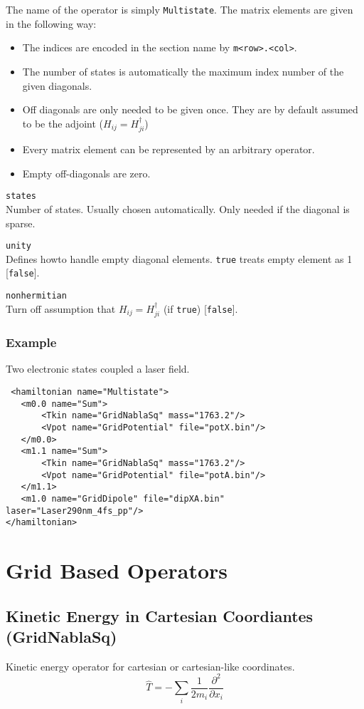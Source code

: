\documentclass[a4paper,12pt]{scrbook}
\newcommand{\option}[2]{\item \texttt{#1}\\ #2}
\newcommand{\code}[1]{\texttt{#1}}
\begin{document}
The name of the operator is simply \verb|Multistate|. The matrix elements are given in the following way:
\begin{itemize}
 \item The indices are encoded in the section name by \verb|m<row>.<col>|.
 \item The number of states is automatically the maximum index number of the given diagonals.
 \item Off diagonals are only needed to be given once. They are by default assumed to be the adjoint ($H_{ij} = H_{ji}^\dagger$)
 \item Every matrix element can be represented by an arbitrary operator.
 \item Empty off-diagonals are zero.
\end{itemize}

\begin{options}
 \option{states}{Number of states. Usually chosen automatically. Only needed if the diagonal is sparse.}
 \option{unity}{Defines howto handle empty diagonal elements. \code{true} treats empty element as 1 [\code{false}].}
 \option{nonhermitian}{Turn off assumption that $H_{ij} = H_{ji}^\dagger$ (if \code{true}) [\code{false}].}
\end{options}


\subsubsection*{Example}
Two electronic states coupled a laser field.
\begin{verbatim}
 <hamiltonian name="Multistate">
   <m0.0 name="Sum">
       <Tkin name="GridNablaSq" mass="1763.2"/>
       <Vpot name="GridPotential" file="potX.bin"/>
   </m0.0>
   <m1.1 name="Sum">
       <Tkin name="GridNablaSq" mass="1763.2"/>
       <Vpot name="GridPotential" file="potA.bin"/>
   </m1.1>
   <m1.0 name="GridDipole" file="dipXA.bin" laser="Laser290nm_4fs_pp"/>
</hamiltonian>
\end{verbatim}


\section{Grid Based Operators}

\subsection{Kinetic Energy in Cartesian Coordiantes (GridNablaSq)}
Kinetic energy operator for cartesian or cartesian-like coordinates.
\begin{equation}
 \hat T = -\sum_i \frac{1}{2m_i}\frac{\partial^2}{\partial x_i}
\end{equation}
\end{document}
